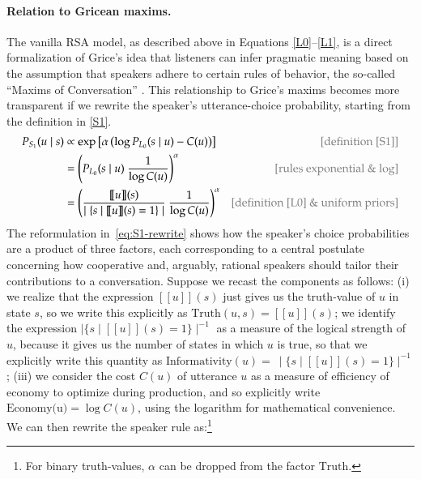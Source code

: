 \documentclass[10pt,letterpaper]{article}
\newcommand{\sem}[1]{\ensuremath{[\![#1]\!]}}
\begin{document}
\paragraph{Relation to Gricean maxims.} The vanilla RSA model, as described above in Equations
\eqref{L0}--\eqref{L1}, is a direct formalization of Grice's idea that listeners can infer
pragmatic meaning based on the assumption that speakers adhere to certain rules of behavior,
the so-called ``Maxims of Conversation'' \cite{Grice1975:Logic-and-Conve}. This relationship to Grice's maxims becomes more
transparent if we rewrite the speaker's utterance-choice probability, starting from the
definition in \eqref{S1}.
%
\begin{align} \label{eq:S1-rewrite}
  P_{S_1}(u\mid s) & \propto \exp \left [ \alpha \left (\log P_{L_0}(s \mid u) - C(u) \right)  \right ] & \text{\textcolor{gray}{[definition \eqref{S1}]}} \\
  & = \left (P_{L_0}(s \mid u) \  \frac{1}{\log C(u)} \right)^{\alpha} & \text{\textcolor{gray}{[rules exponential \& log]}} \nonumber \\
  & = \left ( \frac{\sem{u}(s)}{\mid  \{s \mid \sem{u}(s)=1\} \mid } \ \frac{1}{\log C(u)} \right )^{\alpha} & \text{\textcolor{gray}{[definition \eqref{L0} \& uniform priors]}} \nonumber
\end{align}
%
The reformulation in~\eqref{eq:S1-rewrite} shows how the speaker's choice probabilities are a
product of three factors, each corresponding to a central postulate concerning how cooperative and, arguably, rational speakers should tailor their contributions
to a conversation. Suppose we recast the components as follows: (i) we realize that the expression $\sem{u}(s)$ just gives us the truth-value of $u$ in state $s$, so we write this explicitly as 
$\text{Truth}(u,s) = \sem{u}(s)$; we identify the expression $\mid \{s \mid \sem{u}(s)=1\} \mid ^{-1}$ as a measure of the logical strength of $u$, because it gives us the number of states in which $u$ is true, so that we explicitly write this quantity as  $\text{Informativity}(u) =\  \mid \{s \mid \sem{u}(s)=1\} \mid ^{-1}$; (iii) we consider the cost $C(u)$ of utterance $u$ as a measure of efficiency of economy to optimize during production, and so explicitly write $\text{Economy(u)} = \log C(u)$, using the logarithm for mathematical convenience. We can then rewrite the speaker rule as:\footnote{For
binary truth-values, $\alpha$ can be dropped from the factor $\text{Truth}$.}
\end{document}
